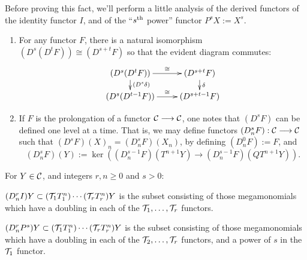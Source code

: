 \documentclass[10pt]{article}
\newcommand{\Comm}{\calC}
\begin{document}
\begin{convergenceOLD}
Before proving this fact, we'll perform a little analysis of the derived functors of the identity functor $I$, and of the ``$s^\textup{th}$ power'' functor $P^sX:=X^s$.
\begin{enumerate}\squishlist
\setlength{\parindent}{.25in}
\item For any functor $F$, there is a natural isomorphism $(D^s(D^tF))\cong (D^{s+t}F)$ so that the evident diagram commutes:
\[\xymatrix@R=4mm{
(D^s(D^tF))
\ar[r]^-{\cong}
\ar[d]^-{(D^s\delta)}
&%
(D^{s+t}F)
\ar[d]^-{\delta}
\\%
(D^s(D^{t-1}F))
\ar[r]^-{\cong}&%
(D^{s+t-1}F)
}\]
\item If $F$ is the prolongation of a functor $\Comm\to\Comm$, one notes that $(D^sF)$ can be defined one level at a time. That is,  we may define functors $(D^s_nF):\Comm\to\Comm$ such that $(D^sF)(X)_n=(D^s_nF)(X_n)$, by defining $(D^0_nF):=F$, and
\[(D^s_nF)(Y):=\ker((D^{s-1}_nF)(T^{n+1}Y)\to (D^{s-1}_nF)(QT^{n+1}Y)).\]
\end{enumerate}
\begin{lem}
For $Y\in\Comm$, and integers $r,n\geq0$ and $s>0$:
\begin{itemise}
\setlength{\parindent}{.25in}
\item $(D^r_nI)Y\subset (\mathcal{T}_1T^n_1)\cdots (\mathcal{T}_rT^n_r)Y$ is the subset consisting of those mega\-monomials which have a doubling in each of the $\mathcal{T}_1,\ldots,\mathcal{T}_r$ functors.
\item $(D^r_nP^{s})Y\subset (\mathcal{T}_1T^n_1)\cdots (\mathcal{T}_rT^n_r)Y$ is the subset consisting of those mega\-monomials which have a doubling in each of the $\mathcal{T}_2,\ldots,\mathcal{T}_r$ functors, and a power of $s$ in the $\mathcal{T}_1$ functor.
\end{itemise}


\end{lem}
\end{convergenceOLD}
\end{document}
